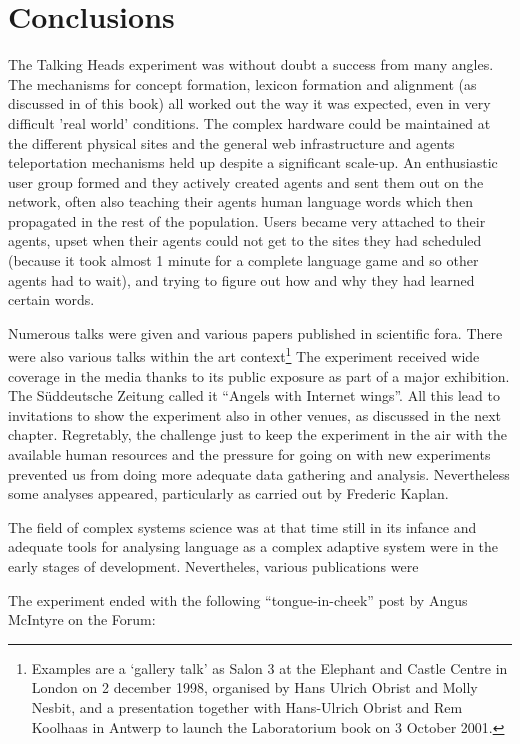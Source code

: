 \section{Conclusions} 

The Talking Heads experiment was without doubt a success from many angles. The mechanisms for concept formation,
lexicon formation and alignment (as discussed in  of this book) all worked out the 
way it was expected, even in very difficult 'real world' conditions. The complex hardware could be maintained at the 
different physical sites and the general web infrastructure and agents teleportation mechanisms held up despite a 
significant scale-up. An enthusiastic user group formed and they actively created agents and sent 
them out on the network, often also teaching their agents human language words which then propagated
in the rest of the population. Users became very attached to their agents, upset when their agents could not get 
to the sites they had scheduled (because it took almost 1 minute for a complete language game and so other agents 
had to wait), and trying to figure out how and why they had learned certain words. 

Numerous talks were given and various papers published in scientific fora. There were also various talks within 
the art context\footnote{Examples are a `gallery talk' as Salon 3 at the Elephant and Castle Centre
in London on 2 december 1998, organised by Hans Ulrich Obrist and Molly Nesbit, and a presentation together with 
Hans-Ulrich Obrist and Rem Koolhaas in Antwerp to launch the Laboratorium book on 3 October 2001.}
The experiment received wide coverage in 
the media thanks to its public exposure as part of a major exhibition. The Süddeutsche Zeitung called it 
``Angels with Internet wings''. All this lead to invitations to show the experiment
also in other venues, as discussed in the next chapter. 
Regretably, the challenge just to keep the experiment in the air with the available human resources
and the pressure for going on with new experiments prevented us from doing more adequate data gathering 
and analysis. Nevertheless some analyses appeared, particularly as carried out by Frederic Kaplan\cite{Kaplan:2001}. 

The field of complex systems science was at that time still in its infance and 
adequate tools for analysing language as a complex adaptive system were in the early stages of development. 
Nevertheles, various publications were 

The experiment ended with the following ``tongue-in-cheek'' post by Angus McIntyre on the Forum:

